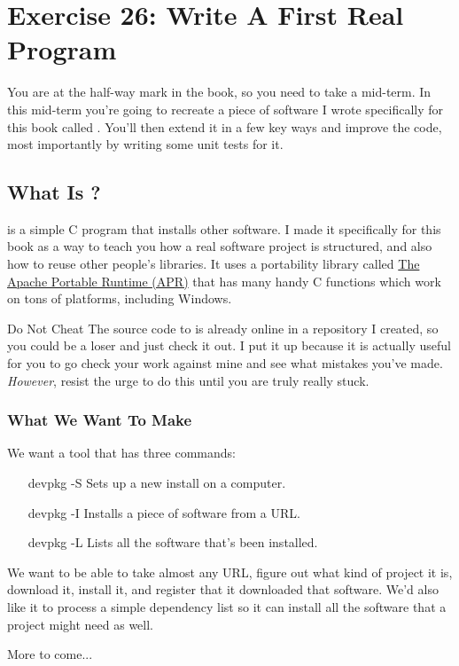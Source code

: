 \chapter{Exercise 26: Write A First Real Program}

You are at the half-way mark in the book, so you need to take a 
mid-term.  In this mid-term you're going to recreate a piece
of software I wrote specifically for this book called .
You'll then extend it in a few key ways and improve the code, most
importantly by writing some unit tests for it.

\section{What Is ?}

 is a simple C program that installs other software.  I
made it specifically for this book as a way to teach you how a real 
software project is structured, and also how to reuse other people's
libraries.  It uses a portability library called \href{http://apr.apache.org/}{The
Apache Portable Runtime (APR)} that has many handy C functions which
work on tons of platforms, including Windows.

\begin{aside}{Do Not Cheat}
The source code to  is already online in a repository
I created, so you could be a loser and just check it out.  I put it up
because it is actually useful for you to go check your work against
mine and see what mistakes you've made.  \emph{However}, resist the
urge to do this until you are truly really stuck.
\end{aside}

\subsection{What We Want To Make}

We want a tool that has three commands:

\begin{enumerate}
\item[devpkg -S] Sets up a new install on a computer.
\item[devpkg -I] Installs a piece of software from a URL.
\item[devpkg -L] Lists all the software that's been installed.
\end{enumerate}

We want  to be able to take almost any URL, figure
out what kind of project it is, download it, install it, and register
that it downloaded that software.  We'd also like it to process a
simple dependency list so it can install all the software that a
project might need as well.

More to come...
